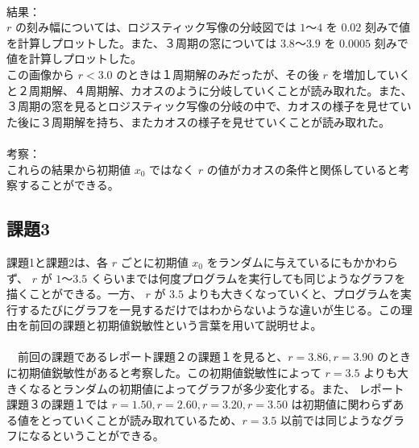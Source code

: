 \\
結果：\\
$r$ の刻み幅については、ロジスティック写像の分岐図では $1〜4$ を $0.02$ 刻みで値を計算しプロットした。また、３周期の窓については $3.8〜3.9$ を $0.0005$ 刻みで値を計算しプロットした。\\
この画像から $r < 3.0$ のときは１周期解のみだったが、その後 $r$ を増加していくと２周期解、４周期解、カオスのように分岐していくことが読み取れた。また、３周期の窓を見るとロジスティック写像の分岐の中で、カオスの様子を見せていた後に３周期解を持ち、またカオスの様子を見せていくことが読み取れた。\\\\
考察：\\
これらの結果から初期値 $x_0$ ではなく $r$ の値がカオスの条件と関係していると考察することができる。

\subsection{課題3}
課題1と課題2は、各 $r$ ごとに初期値 $x_0$ をランダムに与えているにもかかわらず、 $r$ が $1～3.5$ くらいまでは何度プログラムを実行しても同じようなグラフを描くことができる。一方、 $r$ が $3.5$ よりも大きくなっていくと、プログラムを実行するたびにグラフを一見するだけではわからないような違いが生じる。この理由を前回の課題と初期値鋭敏性という言葉を用いて説明せよ。\\\\
　前回の課題であるレポート課題２の課題１を見ると、$r = 3.86, r = 3.90$ のときに初期値鋭敏性があると考察した。この初期値鋭敏性によって $r = 3.5$ よりも大きくなるとランダムの初期値によってグラフが多少変化する。また、 レポート課題３の課題１では $r = 1.50, r = 2.60, r = 3.20, r = 3.50$ は初期値に関わらずある値をとっていくことが読み取れているため、$r = 3.5$ 以前では同じようなグラフになるということができる。
